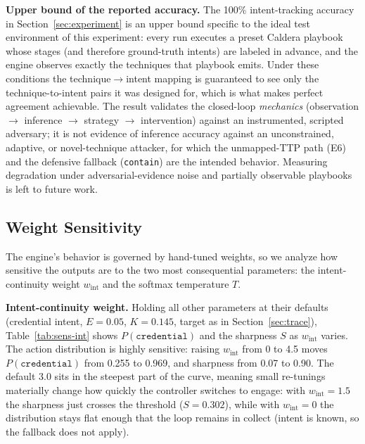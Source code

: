 \documentclass[preprints,article,accept,oneauthor]{Definitions/mdpi}
\newcommand{\act}[1]{\texttt{#1}}
\begin{document}
\textbf{Upper bound of the reported accuracy.} The 100\% intent-tracking
accuracy in Section~\ref{sec:experiment} is an upper bound specific to the
ideal test environment of this experiment: every run executes a preset
Caldera playbook whose stages (and therefore ground-truth intents) are
labeled in advance, and the engine observes exactly the techniques that
playbook emits. Under these conditions the technique$\to$intent mapping is
guaranteed to see only the technique-to-intent pairs it was designed for,
which is what makes perfect agreement achievable. The result validates the
closed-loop \textit{mechanics} (observation $\to$ inference $\to$ strategy
$\to$ intervention) against an instrumented, scripted adversary; it is not
evidence of inference accuracy against an unconstrained, adaptive, or
novel-technique attacker, for which the unmapped-TTP path (E6) and the
defensive fallback (\act{contain}) are the intended behavior. Measuring
degradation under adversarial-evidence noise and partially observable
playbooks is left to future work.

\subsection{Weight Sensitivity}
\label{sec:sensitivity}

The engine's behavior is governed by hand-tuned weights, so we analyze how
sensitive the outputs are to the two most consequential parameters: the
intent-continuity weight $w_{\mathrm{int}}$ and the softmax temperature $T$.

\textbf{Intent-continuity weight.} Holding all other parameters at their
defaults (credential intent, $E=0.05$, $K=0.145$, target as in
Section~\ref{sec:trace}), Table~\ref{tab:sens-int} shows $P(\act{credential})$
and the sharpness $S$ as $w_{\mathrm{int}}$ varies. The action
distribution is highly sensitive: raising $w_{\mathrm{int}}$ from 0 to 4.5
moves $P(\act{credential})$ from 0.255 to 0.969, and sharpness from 0.07
to 0.90. The default 3.0 sits in the steepest part of the curve, meaning
small re-tunings materially change how quickly the controller switches to
engage: with $w_{\mathrm{int}} = 1.5$ the sharpness just crosses the
threshold ($S = 0.302$), while with $w_{\mathrm{int}} = 0$ the distribution
stays flat enough that the loop remains in collect (intent is known, so
the fallback does not apply).
\end{document}
